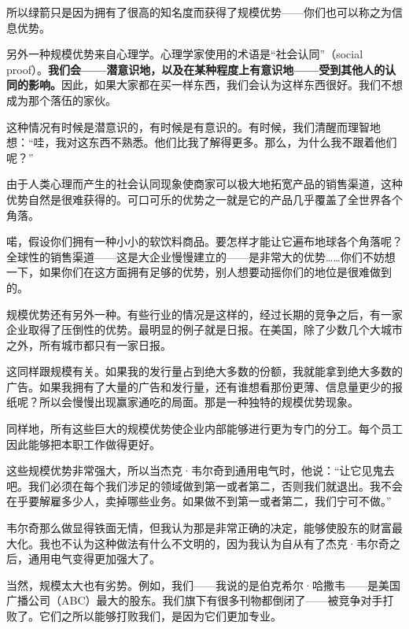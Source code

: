 所以绿箭只是因为拥有了很高的知名度而获得了规模优势——你们也可以称之为信息优势。
\par

另外一种规模优势来自心理学。心理学家使用的术语是“社会认同”（social proof）。\textbf{我们会——潜意识地，以及在某种程度上有意识地——受到其他人的认同的影响。}因此，如果大家都在买一样东西，我们会认为这样东西很好。我们不想成为那个落伍的家伙。
\par

这种情况有时候是潜意识的，有时候是有意识的。有时候，我们清醒而理智地想：“哇，我对这东西不熟悉。他们比我了解得更多。那么，为什么我不跟着他们呢？”
\par

由于人类心理而产生的社会认同现象使商家可以极大地拓宽产品的销售渠道，这种优势自然是很难获得的。可口可乐的优势之一就是它的产品几乎覆盖了全世界各个角落。
\par

喏，假设你们拥有一种小小的软饮料商品。要怎样才能让它遍布地球各个角落呢？全球性的销售渠道——这是大企业慢慢建立的——是非常大的优势……你们不妨想一下，如果你们在这方面拥有足够的优势，别人想要动摇你们的地位是很难做到的。
\par

规模优势还有另外一种。有些行业的情况是这样的，经过长期的竞争之后，有一家企业取得了压倒性的优势。最明显的例子就是日报。在美国，除了少数几个大城市之外，所有城市都只有一家日报。
\par

这同样跟规模有关。如果我的发行量占到绝大多数的份额，我就能拿到绝大多数的广告。如果我拥有了大量的广告和发行量，还有谁想看那份更薄、信息量更少的报纸呢？所以会慢慢出现赢家通吃的局面。那是一种独特的规模优势现象。
\par

同样地，所有这些巨大的规模优势使企业内部能够进行更为专门的分工。每个员工因此能够把本职工作做得更好。
\par

这些规模优势非常强大，所以当杰克·韦尔奇到通用电气时，他说：“让它见鬼去吧。我们必须在每个我们涉足的领域做到第一或者第二，否则我们就退出。我不会在乎要解雇多少人，卖掉哪些业务。如果做不到第一或者第二，我们宁可不做。”
\par

韦尔奇那么做显得铁面无情，但我认为那是非常正确的决定，能够使股东的财富最大化。我也不认为这种做法有什么不文明的，因为我认为自从有了杰克·韦尔奇之后，通用电气变得更加强大了。
\par

当然，规模太大也有劣势。例如，我们——我说的是伯克希尔·哈撒韦——是美国广播公司（ABC）最大的股东。我们旗下有很多刊物都倒闭了——被竞争对手打败了。它们之所以能够打败我们，是因为它们更加专业。
\par


